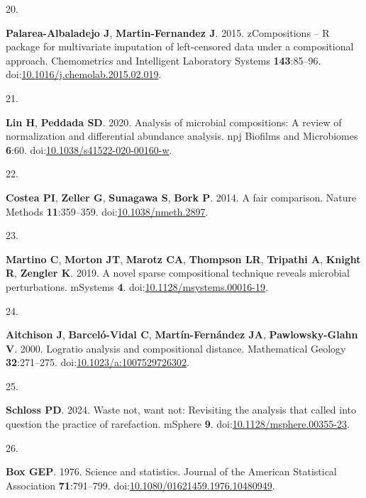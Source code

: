 \documentclass[
  11pt,
]{article}
\newlength{\cslhangindent}
\newlength{\csllabelwidth}
\newenvironment{CSLReferences}[2] %
 {\begin{list}{}{%
  \setlength{\itemindent}{0pt}
  \setlength{\leftmargin}{0pt}
  \setlength{\parsep}{0pt}
  \ifodd #1
   \setlength{\leftmargin}{\cslhangindent}
   \setlength{\itemindent}{-1\cslhangindent}
  \fi
  \setlength{\itemsep}{#2\baselineskip}}}
 {\end{list}}
\newcommand{\CSLLeftMargin}[1]{\parbox[t]{\csllabelwidth}{\strut#1\strut}}
\newcommand{\CSLRightInline}[1]{\parbox[t]{\linewidth - \csllabelwidth}{\strut#1\strut}}
\begin{document}
\begin{CSLReferences}{0}{1}
\CSLLeftMargin{20. }%
\CSLRightInline{\textbf{Palarea-Albaladejo J}, \textbf{Martin-Fernandez
J}. 2015. zCompositions -- {R} package for multivariate imputation of
left-censored data under a compositional approach. Chemometrics and
Intelligent Laboratory Systems \textbf{143}:85--96.
doi:\href{https://doi.org/10.1016/j.chemolab.2015.02.019}{10.1016/j.chemolab.2015.02.019}.}

\CSLLeftMargin{21. }%
\CSLRightInline{\textbf{Lin H}, \textbf{Peddada SD}. 2020. Analysis of
microbial compositions: A review of normalization and differential
abundance analysis. npj Biofilms and Microbiomes \textbf{6}:60.
doi:\href{https://doi.org/10.1038/s41522-020-00160-w}{10.1038/s41522-020-00160-w}.}

\CSLLeftMargin{22. }%
\CSLRightInline{\textbf{Costea PI}, \textbf{Zeller G}, \textbf{Sunagawa
S}, \textbf{Bork P}. 2014. A fair comparison. Nature Methods
\textbf{11}:359--359.
doi:\href{https://doi.org/10.1038/nmeth.2897}{10.1038/nmeth.2897}.}

\CSLLeftMargin{23. }%
\CSLRightInline{\textbf{Martino C}, \textbf{Morton JT}, \textbf{Marotz
CA}, \textbf{Thompson LR}, \textbf{Tripathi A}, \textbf{Knight R},
\textbf{Zengler K}. 2019. A novel sparse compositional technique reveals
microbial perturbations. mSystems \textbf{4}.
doi:\href{https://doi.org/10.1128/msystems.00016-19}{10.1128/msystems.00016-19}.}

\CSLLeftMargin{24. }%
\CSLRightInline{\textbf{Aitchison J}, \textbf{Barceló-Vidal C},
\textbf{Martín-Fernández JA}, \textbf{Pawlowsky-Glahn V}. 2000. Logratio
analysis and compositional distance. Mathematical Geology
\textbf{32}:271--275.
doi:\href{https://doi.org/10.1023/a:1007529726302}{10.1023/a:1007529726302}.}

\CSLLeftMargin{25. }%
\CSLRightInline{\textbf{Schloss PD}. 2024. Waste not, want not:
Revisiting the analysis that called into question the practice of
rarefaction. mSphere \textbf{9}.
doi:\href{https://doi.org/10.1128/msphere.00355-23}{10.1128/msphere.00355-23}.}

\CSLLeftMargin{26. }%
\CSLRightInline{\textbf{Box GEP}. 1976. Science and statistics. Journal
of the American Statistical Association \textbf{71}:791--799.
doi:\href{https://doi.org/10.1080/01621459.1976.10480949}{10.1080/01621459.1976.10480949}.}


\end{CSLReferences}
\end{document}
